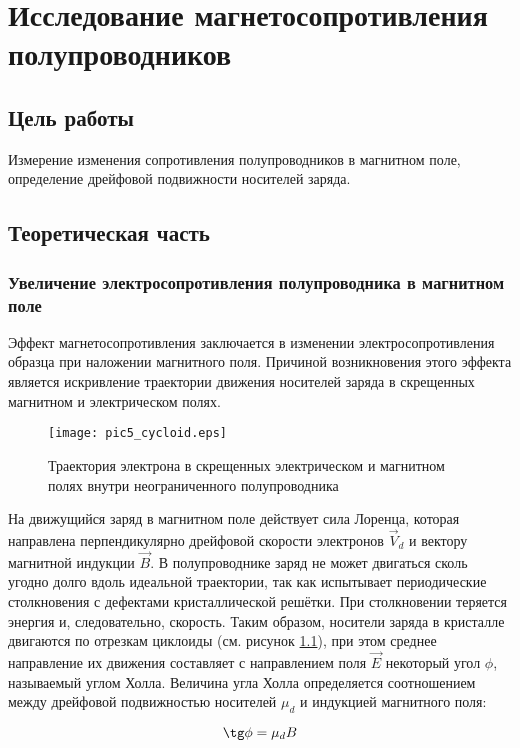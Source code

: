 \chapter{Исследование магнетосопротивления полупроводников}

\section{Цель работы}
Измерение изменения сопротивления полупроводников в магнитном поле, определение дрейфовой подвижности носителей заряда.

\section{Теоретическая часть}
\subsection{Увеличение электросопротивления полупроводника в магнитном поле}

Эффект магнетосопротивления заключается в изменении электросопротивления образца при наложении магнитного поля. Причиной возникновения этого эффекта является искривление траектории движения носителей заряда в скрещенных магнитном и электрическом полях.

\begin{figure}[h!]\centering
\texttt{[image: pic5\_cycloid.eps]}
\caption{Траектория электрона в скрещенных электрическом и магнитном полях внутри неограниченного полупроводника}
\label{pic5_cycloid}
\end{figure}

На движущийся заряд в магнитном поле действует сила Лоренца, которая направлена перпендикулярно дрейфовой скорости электронов $\overrightarrow{V}_{d}$ и вектору магнитной индукции $\overrightarrow{B}$. В полупроводнике заряд не может двигаться сколь угодно долго вдоль идеальной траектории, так как испытывает периодические столкновения с дефектами кристаллической решётки. При столкновении теряется энергия и, следовательно, скорость. Таким образом, носители заряда в кристалле двигаются по отрезкам циклоиды (см. рисунок \ref{pic5_cycloid}), при этом среднее направление их движения составляет с направлением поля $\overrightarrow{E}$ некоторый угол $\phi$, называемый углом Холла. Величина угла Холла определяется соотношением между дрейфовой подвижностью носителей $\mu_{d} $ и индукцией магнитного поля:

\begin{equation}
\tg \phi = \mu_{d} B
\end{equation}

